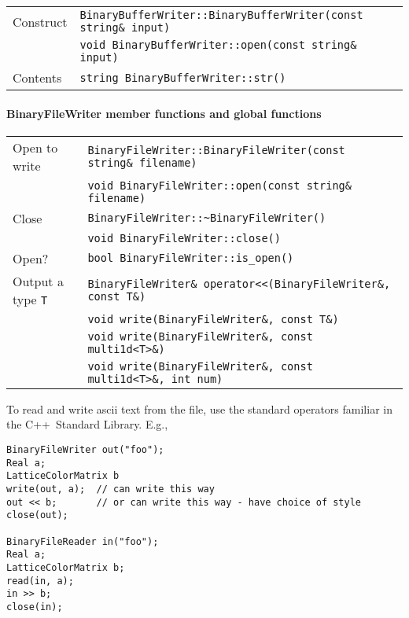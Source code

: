 \documentclass[12pt,letterpaper]{article}
\newcommand{\cpp}{C++}
\begin{document}
\begin{flushleft}
  \begin{tabular}{|l|l|}
  \hline
  Construct      & \verb|BinaryBufferWriter::BinaryBufferWriter(const string& input)|\\
                 & \verb|void BinaryBufferWriter::open(const string& input)|\\
  \hline
  Contents       & \verb|string BinaryBufferWriter::str()| \\
  \hline
 \end{tabular}
\end{flushleft}
\paragraph{BinaryFileWriter member functions and global functions}

\begin{flushleft}
  \begin{tabular}{|l|l|}
  \hline
  Open to write  & \verb|BinaryFileWriter::BinaryFileWriter(const string& filename)|\\
                 & \verb|void BinaryFileWriter::open(const string& filename)|\\
  \hline
  Close          & \verb|BinaryFileWriter::~BinaryFileWriter()|\\
                 & \verb|void BinaryFileWriter::close()|\\
  \hline
  Open?          & \verb|bool BinaryFileWriter::is_open()| \\
  \hline
  Output a type \verb|T| & \verb|BinaryFileWriter& operator<<(BinaryFileWriter&, const T&)| \\
                 & \verb|void write(BinaryFileWriter&, const T&)| \\
                 & \verb|void write(BinaryFileWriter&, const multi1d<T>&)| \\
                 & \verb|void write(BinaryFileWriter&, const multi1d<T>&, int num)| \\
  \hline
 \end{tabular}
\end{flushleft}
%
To read and write ascii text from the file, use the standard operators
familiar in the \cpp\ Standard Library. E.g.,
%
\begin{small}
\begin{verbatim}
BinaryFileWriter out("foo");
Real a;
LatticeColorMatrix b
write(out, a);  // can write this way
out << b;       // or can write this way - have choice of style
close(out);

BinaryFileReader in("foo");
Real a;
LatticeColorMatrix b;
read(in, a);
in >> b;
close(in);
\end{verbatim}
\end{small}
\end{document}
